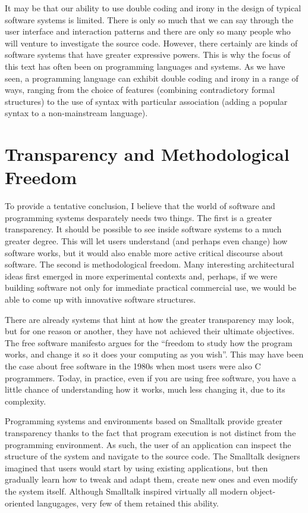 It may be that our ability to use double coding and irony in the design of typical software
systems is limited. There is only so much that we can say through the user interface and
interaction patterns and there are only so many people who will venture to investigate the source
code. However, there certainly are kinds of software systems that have greater expressive powers.
This is why the focus of this text has often been on programming languages and systems.
As we have seen, a programming language can exhibit double coding and irony in a range of ways,
ranging from the choice of features (combining contradictory formal structures) to the use of
syntax with particular association (adding a popular syntax to a non-mainstream language).

\section{Transparency and Methodological Freedom}

To provide a tentative conclusion, I believe that the world of software and programming systems
desparately needs two things. The first is a greater transparency. It should be possible to see
inside software systems to a much greater degree. This will let users understand (and perhaps
even change) how software works, but it would also enable more active critical discourse
about software. The second is methodological freedom. Many interesting architectural ideas
first emerged in more experimental contexts and, perhaps, if we were building software not
only for immediate practical commercial use, we would be able to come up with innovative software
structures.

There are already systems that hint at how the greater transparency may look, but for one reason
or another, they have not achieved their ultimate objectives. The free software manifesto argues
for the ``freedom to study how the program works, and change it so it does your computing as you
wish''. This may have been the case about free software in the 1980s when
most users were also C programmers. Today, in practice, even if you are using free software,
you have a little chance of understanding how it works, much less changing it, due to its
complexity.

Programming systems and environments based on Smalltalk provide greater transparency thanks to
the fact that program execution is not distinct from the programming environment. As such, the
user of an application can inspect the structure of the system and navigate to the source code.
The Smalltalk designers imagined that users would start by using existing applications, but then
gradually learn how to tweak and adapt them, create new ones and even modify the system
itself.
Although Smalltalk inspired virtually all modern object-oriented langugages, very few of them
retained this ability.

